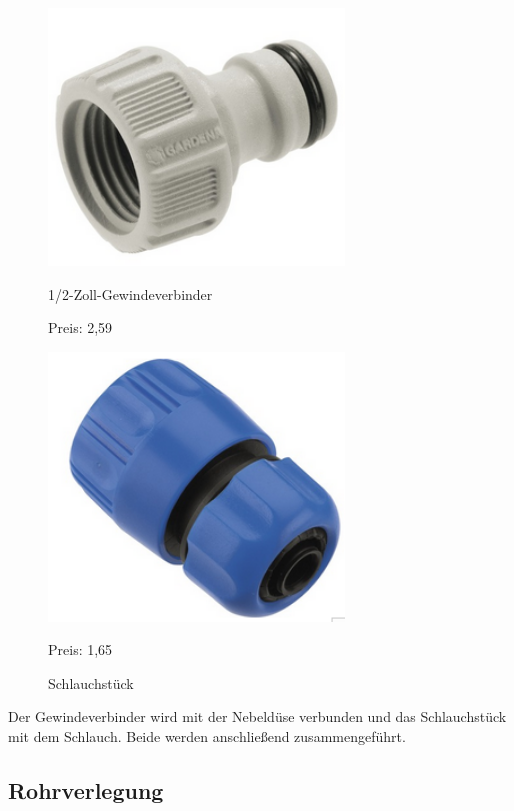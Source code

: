 \begin{figure}[!ht]
\begin{minipage}[t]{0.45\textwidth}
\includegraphics[width=0.7\textwidth]{GardenaHahnverbinder}
\caption{1/2-Zoll-Gewindeverbinder}
Preis: 2,59 \textsf{\texteuro}
\end{minipage}
\hspace{0.1\textwidth}
\begin{minipage}[t]{0.45\textwidth}
\includegraphics[width=0.7\textwidth]{Schlauchstueck}
\caption{Schlauchstück}
Preis: 1,65\textsf{\texteuro}
\end{minipage}
\end{figure}

Der Gewindeverbinder wird mit der Nebeldüse verbunden und das Schlauchstück mit dem Schlauch. Beide werden anschließend zusammengeführt.

\subsection{Rohrverlegung}
\label{sec:rohrverlegung}

